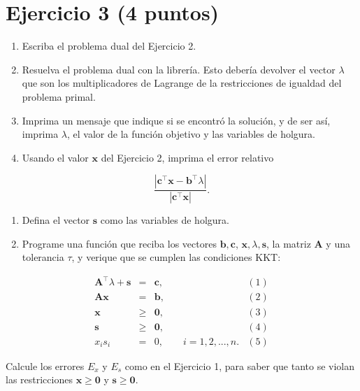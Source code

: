 \documentclass[11pt]{article}
\providecommand{\tightlist}{%
      \setlength{\itemsep}{0pt}\setlength{\parskip}{0pt}}
\begin{document}
    \hypertarget{ejercicio-3-4-puntos}{%
\section{Ejercicio 3 (4 puntos)}\label{ejercicio-3-4-puntos}}

\begin{enumerate}
\def\labelenumi{\arabic{enumi}.}
\tightlist
\item
  Escriba el problema dual del Ejercicio 2.
\item
  Resuelva el problema dual con la librería. Esto debería devolver el
  vector \(\lambda\) que son los multiplicadores de Lagrange de la
  restricciones de igualdad del problema primal.
\item
  Imprima un mensaje que indique si se encontró la solución, y de ser
  así, imprima \(\lambda\), el valor de la función objetivo y las
  variables de holgura.
\item
  Usando el valor \(\mathbf{x}\) del Ejercicio 2, imprima el error
  relativo
\end{enumerate}

\[\frac{|\mathbf{c}^\top\mathbf{x} - \mathbf{b}^\top\lambda|}
{|\mathbf{c}^\top\mathbf{x}|}.\]

\begin{enumerate}
\def\labelenumi{\arabic{enumi}.}
\setcounter{enumi}{3}
\tightlist
\item
  Defina el vector \(\mathbf{s}\) como las variables de holgura.
\item
  Programe una función que reciba los vectores
  \(\mathbf{b}, \mathbf{c}\), \(\mathbf{x}, \lambda, \mathbf{s}\), la
  matriz \(\mathbf{A}\) y una tolerancia \(\tau\), y verique que se
  cumplen las condiciones KKT:
\end{enumerate}

\[
\begin{array}{rclc}
  \mathbf{A}^\top \lambda + \mathbf{s} &=& \mathbf{c}, & (1) \\
  \mathbf{A}\mathbf{x} &=& \mathbf{b}, & (2) \\
  \mathbf{x} & \geq & \mathbf{0}, & (3)  \\
  \mathbf{s} & \geq & \mathbf{0}, & (4)  \\
  x_i s_i &=& 0, \qquad i=1,2,...,n. & (5)
\end{array}
\]

Calcule los errores \(E_x\) y \(E_{s}\) como en el Ejercicio 1, para
saber que tanto se violan las restricciones
\(\mathbf{x}\geq \mathbf{0}\) y \(\mathbf{s}\geq \mathbf{0}\).
\end{document}
